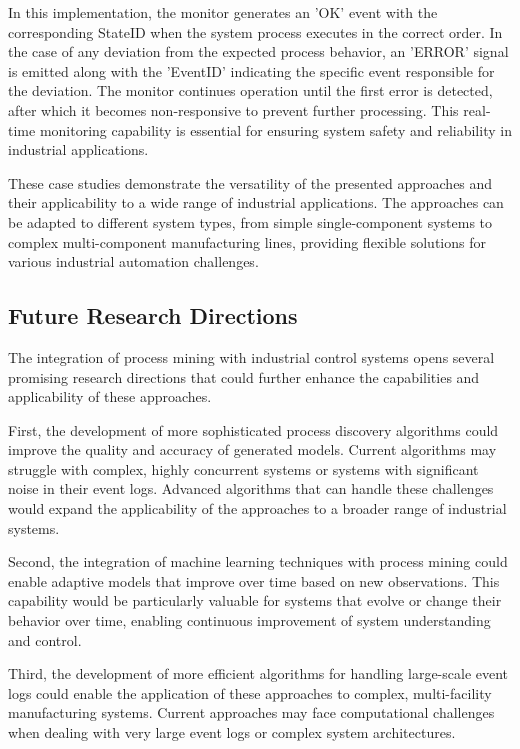 In this implementation, the monitor generates an 'OK' event with the corresponding StateID when the system process executes in the correct order. In the case of any deviation from the expected process behavior, an 'ERROR' signal is emitted along with the 'EventID' indicating the specific event responsible for the deviation. The monitor continues operation until the first error is detected, after which it becomes non-responsive to prevent further processing. This real-time monitoring capability is essential for ensuring system safety and reliability in industrial applications.

These case studies demonstrate the versatility of the presented approaches and their applicability to a wide range of industrial applications. The approaches can be adapted to different system types, from simple single-component systems to complex multi-component manufacturing lines, providing flexible solutions for various industrial automation challenges.

\subsection{Future Research Directions}

The integration of process mining with industrial control systems opens several promising research directions that could further enhance the capabilities and applicability of these approaches.

First, the development of more sophisticated process discovery algorithms could improve the quality and accuracy of generated models. Current algorithms may struggle with complex, highly concurrent systems or systems with significant noise in their event logs. Advanced algorithms that can handle these challenges would expand the applicability of the approaches to a broader range of industrial systems.

Second, the integration of machine learning techniques with process mining could enable adaptive models that improve over time based on new observations. This capability would be particularly valuable for systems that evolve or change their behavior over time, enabling continuous improvement of system understanding and control.

Third, the development of more efficient algorithms for handling large-scale event logs could enable the application of these approaches to complex, multi-facility manufacturing systems. Current approaches may face computational challenges when dealing with very large event logs or complex system architectures.

